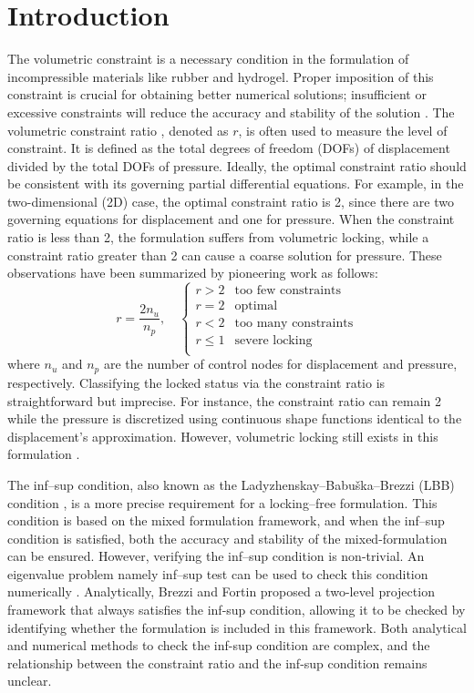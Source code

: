 \section{Introduction}

The volumetric constraint is a necessary condition in the formulation of incompressible materials
like rubber and hydrogel.
Proper imposition of this constraint is crucial for obtaining better numerical solutions;
insufficient or excessive constraints will reduce the accuracy and stability of the solution \cite{brezzi1991a}.
The volumetric constraint ratio \cite{hughes2000}, denoted as $r$, is often used to measure the level of constraint. 
It is defined as the total degrees of freedom (DOFs) of displacement divided by the total DOFs of pressure.
Ideally, the optimal constraint ratio should be consistent with its governing partial differential equations.
For example, in the two-dimensional (2D) case, the optimal constraint ratio is 2, since there are two governing equations for displacement and one for pressure.
When the constraint ratio is less than 2, the formulation suffers from volumetric locking, while a constraint ratio greater than 2 can cause a coarse solution for pressure.
These observations have been summarized by pioneering work \cite{hughes2000} as follows:
\begin{equation}
r = \frac{2n_u}{n_p}, \quad 
\begin{cases}
r > 2 & \text{too few constraints} \\
r = 2 & \text{optimal} \\
r < 2 & \text{too many constraints} \\
r \le 1 & \text{severe locking} \\
\end{cases}
\end{equation}
where $n_u$ and $n_p$ are the number of control nodes for displacement and pressure, respectively.
Classifying the locked status via the constraint ratio is straightforward but imprecise.
For instance, the constraint ratio can remain 2 while the pressure is discretized using continuous shape functions identical to the displacement's approximation.
However, volumetric locking still exists in this formulation \cite{hughes2000}.

The inf--sup condition, also known as the Ladyzhenskay--Babuška--Brezzi (LBB) condition \cite{babuska1997a,bathe1996}, is a more precise requirement for a locking--free formulation.
This condition is based on the mixed formulation framework, and when the inf--sup condition is satisfied, both the accuracy and stability of the mixed-formulation can be ensured.
However, verifying the inf--sup condition is non-trivial.
An eigenvalue problem namely inf--sup test can be used to check this condition numerically \cite{malkus1981,chapelle1993,brezzi,gallistl2019}.
Analytically, Brezzi and Fortin proposed a two-level projection framework that always satisfies the inf-sup condition,
allowing it to be checked by identifying whether the formulation is included in this framework.
Both analytical and numerical methods to check the inf-sup condition are complex,
and the relationship between the constraint ratio and the inf-sup condition remains unclear.

